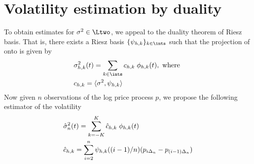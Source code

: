 \section{Volatility estimation by duality}
To obtain estimates for $\svnt \in \Ltwo$, we appeal to the duality theorem of Riesz basis. That is, there exists a Riesz basis $\{\psi_{h,k}\}_{k \in \ints}$ such that the projection of \svnt onto \vh is given by 
\begin{align}
  &\svhk(t)  = \sumi \chk \;\phi_{h,k}(t), \text{ where }\\
  &\chk = \langle \svnt, \psi_{h,k} \rangle
  \label{}
\end{align}
Now given $n$ observations of the log price process $p$, we propose the following estimator of the volatility
\begin{align}
  &\hat{\sigma}_{n}^2(t) = \sum_{k = -K}^{K} \hat{c}_{h,k}\;\phi_{h,k}(t)\\
  &\hat{c}_{h,k} = \sum_{i =2}^n \psi_{h,k}((i-1)/n) (p_{i\Delta_n } - p_{(i-1)\Delta_n}) 
  \label{}
\end{align}
